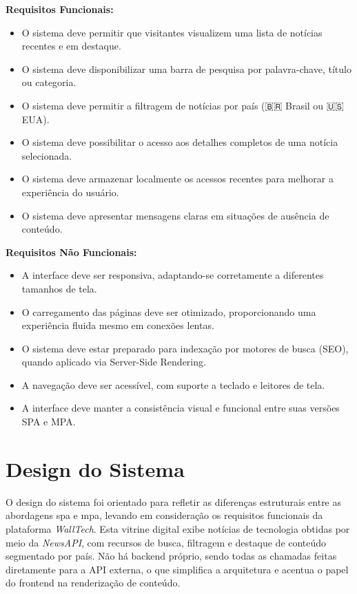 \textbf{Requisitos Funcionais:}
\begin{itemize}
  \item O sistema deve permitir que visitantes visualizem uma lista de notícias recentes e em destaque.
  \item O sistema deve disponibilizar uma barra de pesquisa por palavra-chave, título ou categoria.
  \item O sistema deve permitir a filtragem de notícias por país (🇧🇷 Brasil ou 🇺🇸 EUA).
  \item O sistema deve possibilitar o acesso aos detalhes completos de uma notícia selecionada.
  \item O sistema deve armazenar localmente os acessos recentes para melhorar a experiência do usuário.
  \item O sistema deve apresentar mensagens claras em situações de ausência de conteúdo.
\end{itemize}

\textbf{Requisitos Não Funcionais:}
\begin{itemize}
  \item A interface deve ser responsiva, adaptando-se corretamente a diferentes tamanhos de tela.
  \item O carregamento das páginas deve ser otimizado, proporcionando uma experiência fluida mesmo em conexões lentas.
  \item O sistema deve estar preparado para indexação por motores de busca (SEO), quando aplicado via Server-Side Rendering.
  \item A navegação deve ser acessível, com suporte a teclado e leitores de tela.
  \item A interface deve manter a consistência visual e funcional entre suas versões SPA e MPA.
\end{itemize}




\section{Design do Sistema}
\label{cap:design}

O design do sistema foi orientado para refletir as diferenças estruturais entre as abordagens \acrshort{spa} e \acrshort{mpa}, levando em consideração os requisitos funcionais da plataforma \textit{WallTech}. Esta vitrine digital exibe notícias de tecnologia obtidas por meio da \textit{NewsAPI}, com recursos de busca, filtragem e destaque de conteúdo segmentado por país. Não há backend próprio, sendo todas as chamadas feitas diretamente para a API externa, o que simplifica a arquitetura e acentua o papel do frontend na renderização de conteúdo.

